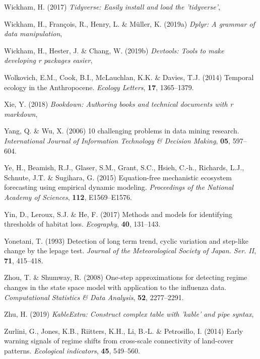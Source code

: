 \documentclass[12pt,twoside,openany]{reedthesis}
\begin{document}
\leavevmode\hypertarget{ref-tidyverse}{}%
Wickham, H. (2017) \emph{Tidyverse: Easily install and load the 'tidyverse'},

\leavevmode\hypertarget{ref-dplyr}{}%
Wickham, H., François, R., Henry, L. \& Müller, K. (2019a) \emph{Dplyr: A grammar of data manipulation},

\leavevmode\hypertarget{ref-devtools}{}%
Wickham, H., Hester, J. \& Chang, W. (2019b) \emph{Devtools: Tools to make developing r packages easier},

\leavevmode\hypertarget{ref-wolkovich_temporal_2014}{}%
Wolkovich, E.M., Cook, B.I., McLauchlan, K.K. \& Davies, T.J. (2014) Temporal ecology in the Anthropocene. \emph{Ecology Letters}, \textbf{17}, 1365--1379.

\leavevmode\hypertarget{ref-bookdown}{}%
Xie, Y. (2018) \emph{Bookdown: Authoring books and technical documents with r markdown},

\leavevmode\hypertarget{ref-yang_10_2006}{}%
Yang, Q. \& Wu, X. (2006) 10 challenging problems in data mining research. \emph{International Journal of Information Technology \& Decision Making}, \textbf{05}, 597--604.

\leavevmode\hypertarget{ref-ye2015equation}{}%
Ye, H., Beamish, R.J., Glaser, S.M., Grant, S.C., Hsieh, C.-h., Richards, L.J., Schnute, J.T. \& Sugihara, G. (2015) Equation-free mechanistic ecosystem forecasting using empirical dynamic modeling. \emph{Proceedings of the National Academy of Sciences}, \textbf{112}, E1569--E1576.

\leavevmode\hypertarget{ref-yin2017methods}{}%
Yin, D., Leroux, S.J. \& He, F. (2017) Methods and models for identifying thresholds of habitat loss. \emph{Ecography}, \textbf{40}, 131--143.

\leavevmode\hypertarget{ref-yonetani1993detection}{}%
Yonetani, T. (1993) Detection of long term trend, cyclic variation and step-like change by the lepage test. \emph{Journal of the Meteorological Society of Japan. Ser. II}, \textbf{71}, 415--418.

\leavevmode\hypertarget{ref-zhou2008one}{}%
Zhou, T. \& Shumway, R. (2008) One-step approximations for detecting regime changes in the state space model with application to the influenza data. \emph{Computational Statistics \& Data Analysis}, \textbf{52}, 2277--2291.

\leavevmode\hypertarget{ref-kableExtra}{}%
Zhu, H. (2019) \emph{KableExtra: Construct complex table with 'kable' and pipe syntax},

\leavevmode\hypertarget{ref-zurlini2014early}{}%
Zurlini, G., Jones, K.B., Riitters, K.H., Li, B.-L. \& Petrosillo, I. (2014) Early warning signals of regime shifts from cross-scale connectivity of land-cover patterns. \emph{Ecological indicators}, \textbf{45}, 549--560.
\end{document}
